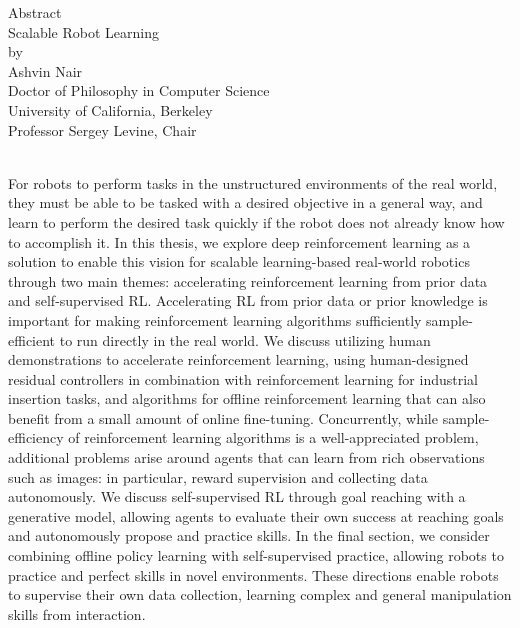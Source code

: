 \begin{center}
\begin{spacing}{2.0}
Abstract \\
Scalable Robot Learning \\
by \\
Ashvin Nair \\
Doctor of Philosophy in Computer Science \\
University of California, Berkeley \\
Professor Sergey Levine, Chair
\end{spacing}
\end{center}
\\

For robots to perform tasks in the unstructured environments of the real world, they must be able to be tasked with a desired objective in a general way, and learn to perform the desired task quickly if the robot does not already know how to accomplish it. In this thesis, we explore deep reinforcement learning as a solution to enable this vision for scalable learning-based real-world robotics through two main themes: accelerating reinforcement learning from prior data and self-supervised RL. Accelerating RL from prior data or prior knowledge is important for making reinforcement learning algorithms sufficiently sample-efficient to run directly in the real world. We discuss utilizing human demonstrations to accelerate reinforcement learning, using human-designed residual controllers in combination with reinforcement learning for industrial insertion tasks, and algorithms for offline reinforcement learning that can also benefit from a small amount of online fine-tuning.
Concurrently, while sample-efficiency of reinforcement learning algorithms is a well-appreciated problem, additional problems arise around agents that can learn from rich observations such as images: in particular, reward supervision and collecting data autonomously. We discuss self-supervised RL through goal reaching with a generative model, allowing agents to evaluate their own success at reaching goals and autonomously propose and practice skills. In the final section, we consider combining offline policy learning with self-supervised practice, allowing robots to practice and perfect skills in novel environments. These directions enable robots to supervise their own data collection, learning complex and general manipulation skills from interaction.